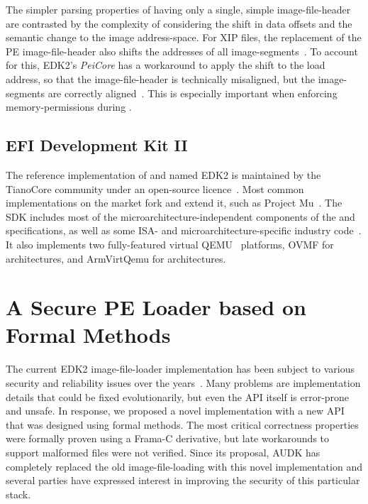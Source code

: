 The simpler parsing properties of having only a single, simple \gls{image-file-header} are contrasted by the complexity of considering the shift in data offsets and the semantic change to the \gls{image} \gls{address-space}. For \gls{XIP} files, the replacement of the \gls{PE} \gls{image-file-header} also shifts the addresses of all \glspl{image-segment}~\cite{secure-pe}. To account for this, \gls{EDK2}'s \textit{PeiCore} has a workaround to apply the shift to the load address, so that the \gls{image-file-header} is technically misaligned, but the \glspl{image-segment} are correctly aligned~\cite{edk2,secure-pe}. This is especially important when enforcing \gls{memory-permissions} during .

\subsection{EFI Development Kit II}

The reference implementation of  and  named \gls{EDK2} is maintained by the TianoCore community under an open-source licence~\cite{edk2}. Most common  implementations on the market fork and extend it, such as  Project Mu~\cite{mu-basecore}. The \gls{SDK} includes most of the microarchitecture-independent components of the  and  specifications, as well as some \gls{ISA}- and microarchitecture-specific industry code~\cite{edk2}. It also implements two fully-featured virtual QEMU~\cite{qemu} platforms, \gls{OVMF} for  architectures, and \gls{ArmVirtQemu} for  architectures.

\section{A Secure PE Loader based on Formal Methods}
\label{sec:formal_pe}

The current \gls{EDK2}  \gls{image-file-loader} implementation has been subject to various security and reliability issues over the years~\cite{secure-pe}. Many problems are implementation details that could be fixed evolutionarily, but even the \gls{API} itself is error-prone and unsafe. In response, we proposed a novel implementation with a new \gls{API} that was designed using formal methods. The most critical correctness properties were formally proven using a Frama-C derivative, but late workarounds to support malformed  files were not verified. Since its proposal, \gls{AUDK} has completely replaced the old \gls{image-file-loading} with this novel implementation and several parties have expressed interest in improving the security of this particular stack.

